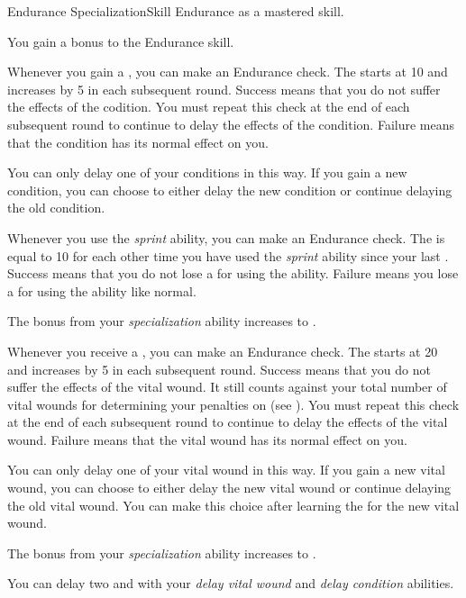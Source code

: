     \begin{feat}{Endurance Specialization}{Skill}
        \featpre Endurance as a mastered skill.

         You gain a  bonus to the Endurance skill.

         Whenever you gain a , you can make an Endurance check.
        The  starts at 10 and increases by 5 in each subsequent round.
        Success means that you do not suffer the effects of the codition.
        You must repeat this check at the end of each subsequent round to continue to delay the effects of the condition.
        Failure means that the condition has its normal effect on you.

        You can only delay one of your conditions in this way.
        If you gain a new condition, you can choose to either delay the new condition or continue delaying the old condition.

         Whenever you use the \textit{sprint} ability, you can make an Endurance check.
        The  is equal to 10  for each other time you have used the \textit{sprint} ability since your last .
        Success means that you do not lose a  for using the ability.
        Failure means you lose a  for using the ability like normal.

         The bonus from your \textit{specialization} ability increases to .

         Whenever you receive a , you can make an Endurance check.
        The  starts at 20 and increases by 5 in each subsequent round.
        Success means that you do not suffer the effects of the vital wound.
        It still counts against your total number of vital wounds for determining your penalties on  (see ).
        You must repeat this check at the end of each subsequent round to continue to delay the effects of the vital wound.
        Failure means that the vital wound has its normal effect on you.

        You can only delay one of your vital wound in this way.
        If you gain a new vital wound, you can choose to either delay the new vital wound or continue delaying the old vital wound.
        You can make this choice after learning the  for the new vital wound.

         The bonus from your \textit{specialization} ability increases to .

         You can delay two  and  with your \textit{delay vital wound} and \textit{delay condition} abilities.
    \end{feat}

